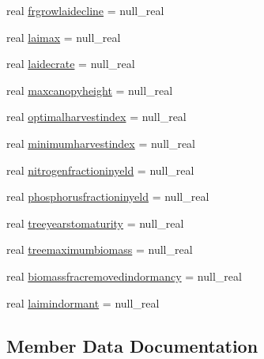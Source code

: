 \begin{DoxyCompactItemize}
\item 
real \mbox{\hyperlink{structmodulevegetation_1_1t__growthdatabase_a686e57cef6c84770cef67d5923199e5d}{frgrowlaidecline}} = null\+\_\+real
\item 
real \mbox{\hyperlink{structmodulevegetation_1_1t__growthdatabase_a5af8f8a9539bd9e80e37df1c9b55d67c}{laimax}} = null\+\_\+real
\item 
real \mbox{\hyperlink{structmodulevegetation_1_1t__growthdatabase_a96f738abfcd54dd7ef4ffc2b2e1be646}{laidecrate}} = null\+\_\+real
\item 
real \mbox{\hyperlink{structmodulevegetation_1_1t__growthdatabase_a84c8738575a822bd0bebf75ceafbd257}{maxcanopyheight}} = null\+\_\+real
\item 
real \mbox{\hyperlink{structmodulevegetation_1_1t__growthdatabase_a7b783bd46bf2bb0291adba8551733228}{optimalharvestindex}} = null\+\_\+real
\item 
real \mbox{\hyperlink{structmodulevegetation_1_1t__growthdatabase_ac70d25974af5dea38be9901aa32e1763}{minimumharvestindex}} = null\+\_\+real
\item 
real \mbox{\hyperlink{structmodulevegetation_1_1t__growthdatabase_ae5eec12acf3fdb59800c52adf26426e5}{nitrogenfractioninyeld}} = null\+\_\+real
\item 
real \mbox{\hyperlink{structmodulevegetation_1_1t__growthdatabase_a2312b67a8c77087c4933afcecdfc8623}{phosphorusfractioninyeld}} = null\+\_\+real
\item 
real \mbox{\hyperlink{structmodulevegetation_1_1t__growthdatabase_a51278935761ec89c4712f3416b037b89}{treeyearstomaturity}} = null\+\_\+real
\item 
real \mbox{\hyperlink{structmodulevegetation_1_1t__growthdatabase_aeb8ecc9d742e611b3be9fe379402333a}{treemaximumbiomass}} = null\+\_\+real
\item 
real \mbox{\hyperlink{structmodulevegetation_1_1t__growthdatabase_ac213bd65a574480a3be53aea6e62d82c}{biomassfracremovedindormancy}} = null\+\_\+real
\item 
real \mbox{\hyperlink{structmodulevegetation_1_1t__growthdatabase_aa541bfcaed94272340e67816eab01e93}{laimindormant}} = null\+\_\+real
\end{DoxyCompactItemize}


\subsection{Member Data Documentation}
\mbox{\label{structmodulevegetation_1_1t__growthdatabase_a498fd59ffff53fcd8261aa310e5a450b}} 
